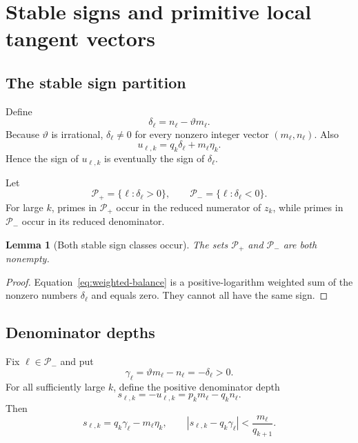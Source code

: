 \documentclass[11pt,oneside]{article}
\newtheorem{lemma}[theorem]{Lemma}
\theoremstyle{definition}
\theoremstyle{remark}
\newcommand{\thetaq}{\vartheta}
\begin{document}
\section{Stable signs and primitive local tangent vectors}
\label{sec:stable}

\subsection{The stable sign partition}

Define
\begin{equation}
 \delta_\ell=n_\ell-\thetaq m_\ell.
 \label{eq:delta}
\end{equation}
Because $\thetaq$ is irrational, $\delta_\ell\ne0$ for every nonzero integer vector
$(m_\ell,n_\ell)$.  Also
\begin{equation}
 u_{\ell,k}
 =q_k\delta_\ell+m_\ell\eta_k.
 \label{eq:u-asymptotic}
\end{equation}
Hence the sign of $u_{\ell,k}$ is eventually the sign of $\delta_\ell$.

Let
\begin{equation}
 \mathcal P_+=\{\ell:\delta_\ell>0\},
 \qquad
 \mathcal P_-=\{\ell:\delta_\ell<0\}.
 \label{eq:Ppm}
\end{equation}
For large $k$, primes in $\mathcal P_+$ occur in the reduced numerator of $z_k$, while primes
in $\mathcal P_-$ occur in its reduced denominator.

\begin{lemma}[Both stable sign classes occur]
\label{lem:both-signs}
The sets $\mathcal P_+$ and $\mathcal P_-$ are both nonempty.
\end{lemma}

\begin{proof}
Equation~\eqref{eq:weighted-balance} is a positive-logarithm weighted sum of the nonzero
numbers $\delta_\ell$ and equals zero.  They cannot all have the same sign.
\end{proof}

\subsection{Denominator depths}

Fix $\ell\in\mathcal P_-$ and put
\begin{equation}
 \gamma_\ell=\thetaq m_\ell-n_\ell=-\delta_\ell>0.
 \label{eq:gamma}
\end{equation}
For all sufficiently large $k$, define the positive denominator depth
\begin{equation}
 s_{\ell,k}=-u_{\ell,k}=p_km_\ell-q_kn_\ell.
 \label{eq:s-depth}
\end{equation}
Then
\begin{equation}
 s_{\ell,k}=q_k\gamma_\ell-m_\ell\eta_k,
 \qquad
 \left|s_{\ell,k}-q_k\gamma_\ell\right|<\frac{m_\ell}{q_{k+1}}.
 \label{eq:s-asymptotic}
\end{equation}
\end{document}
